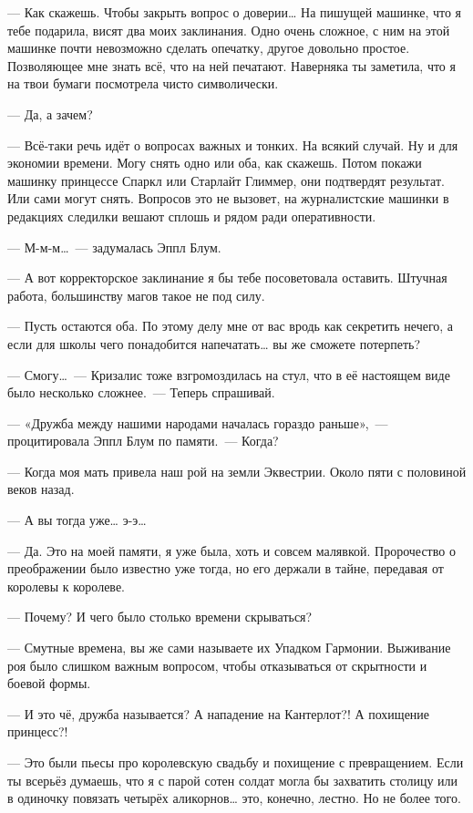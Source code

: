 \documentclass[fontsize=11pt,a5paper,titlepage=firstcover]{scrbook}
\begin{document}
--- Как скажешь. Чтобы закрыть вопрос о доверии{\ldots} На пишущей машинке, что я тебе подарила, висят два моих заклинания. Одно очень сложное, с ним на этой машинке почти невозможно сделать опечатку, другое довольно простое. Позволяющее мне знать всё, что на ней печатают. Наверняка ты заметила, что я на твои бумаги посмотрела чисто символически.

--- Да, а зачем?

--- Всё-таки речь идёт о вопросах важных и тонких. На всякий случай. Ну и для экономии времени. Могу снять одно или оба, как скажешь. Потом покажи машинку принцессе Спаркл или Старлайт Глиммер, они подтвердят результат. Или сами могут снять. Вопросов это не вызовет, на журналистские машинки в редакциях следилки вешают сплошь и рядом ради оперативности.

--- М-м-м{\ldots}~--- задумалась Эппл Блум.

--- А вот корректорское заклинание я бы тебе посоветовала оставить. Штучная работа, большинству магов такое не под силу.

--- Пусть остаются оба. По этому делу мне от вас вродь как секретить нечего, а если для школы чего понадобится напечатать{\ldots} вы же сможете потерпеть?

--- Смогу{\ldots}~--- Кризалис тоже взгромоздилась на стул, что в её настоящем виде было несколько сложнее.~--- Теперь спрашивай.

--- «Дружба между нашими народами началась гораздо раньше»,~--- процитировала Эппл Блум по памяти.~--- Когда?

--- Когда моя мать привела наш рой на земли Эквестрии. Около пяти с половиной веков назад.

--- А вы тогда уже{\ldots} э-э{\ldots}

--- Да. Это на моей памяти, я уже была, хоть и совсем малявкой. Пророчество о преображении было известно уже тогда, но его держали в тайне, передавая от королевы к королеве.

--- Почему? И чего было столько времени скрываться?

--- Смутные времена, вы же сами называете их Упадком Гармонии. Выживание роя было слишком важным вопросом, чтобы отказываться от скрытности и боевой формы.

--- И это чё, дружба называется? А нападение на Кантерлот?! А похищение принцесс?!

--- Это были пьесы про королевскую свадьбу и похищение с превращением. Если ты всерьёз думаешь, что я с парой сотен солдат могла бы захватить столицу или в одиночку повязать четырёх аликорнов{\ldots} это, конечно, лестно. Но не более того.
\end{document}
